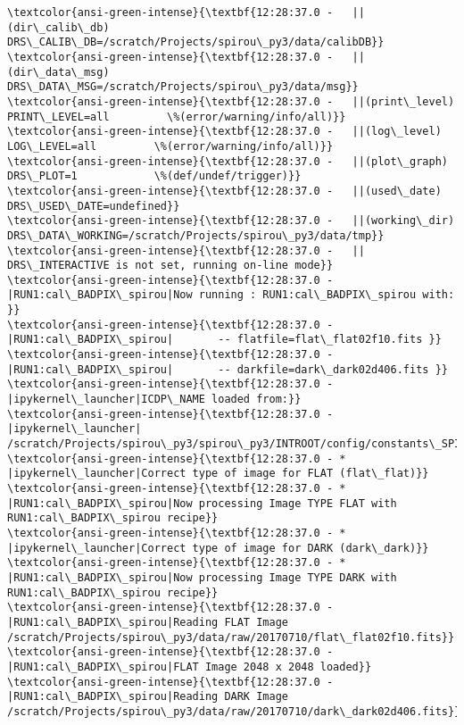 \documentclass[11pt]{article}
\begin{document}
\begin{Verbatim}[commandchars=\\\{\}]
\textcolor{ansi-green-intense}{\textbf{12:28:37.0 -   ||(dir\_calib\_db)      DRS\_CALIB\_DB=/scratch/Projects/spirou\_py3/data/calibDB}}
\textcolor{ansi-green-intense}{\textbf{12:28:37.0 -   ||(dir\_data\_msg)      DRS\_DATA\_MSG=/scratch/Projects/spirou\_py3/data/msg}}
\textcolor{ansi-green-intense}{\textbf{12:28:37.0 -   ||(print\_level)       PRINT\_LEVEL=all         \%(error/warning/info/all)}}
\textcolor{ansi-green-intense}{\textbf{12:28:37.0 -   ||(log\_level)         LOG\_LEVEL=all         \%(error/warning/info/all)}}
\textcolor{ansi-green-intense}{\textbf{12:28:37.0 -   ||(plot\_graph)        DRS\_PLOT=1            \%(def/undef/trigger)}}
\textcolor{ansi-green-intense}{\textbf{12:28:37.0 -   ||(used\_date)         DRS\_USED\_DATE=undefined}}
\textcolor{ansi-green-intense}{\textbf{12:28:37.0 -   ||(working\_dir)       DRS\_DATA\_WORKING=/scratch/Projects/spirou\_py3/data/tmp}}
\textcolor{ansi-green-intense}{\textbf{12:28:37.0 -   ||                    DRS\_INTERACTIVE is not set, running on-line mode}}
\textcolor{ansi-green-intense}{\textbf{12:28:37.0 -   |RUN1:cal\_BADPIX\_spirou|Now running : RUN1:cal\_BADPIX\_spirou with: }}
\textcolor{ansi-green-intense}{\textbf{12:28:37.0 -   |RUN1:cal\_BADPIX\_spirou|       -- flatfile=flat\_flat02f10.fits }}
\textcolor{ansi-green-intense}{\textbf{12:28:37.0 -   |RUN1:cal\_BADPIX\_spirou|       -- darkfile=dark\_dark02d406.fits }}
\textcolor{ansi-green-intense}{\textbf{12:28:37.0 -   |ipykernel\_launcher|ICDP\_NAME loaded from:}}
\textcolor{ansi-green-intense}{\textbf{12:28:37.0 -   |ipykernel\_launcher|     /scratch/Projects/spirou\_py3/spirou\_py3/INTROOT/config/constants\_SPIROU\_H2RG.py}}
\textcolor{ansi-green-intense}{\textbf{12:28:37.0 - * |ipykernel\_launcher|Correct type of image for FLAT (flat\_flat)}}
\textcolor{ansi-green-intense}{\textbf{12:28:37.0 - * |RUN1:cal\_BADPIX\_spirou|Now processing Image TYPE FLAT with RUN1:cal\_BADPIX\_spirou recipe}}
\textcolor{ansi-green-intense}{\textbf{12:28:37.0 - * |ipykernel\_launcher|Correct type of image for DARK (dark\_dark)}}
\textcolor{ansi-green-intense}{\textbf{12:28:37.0 - * |RUN1:cal\_BADPIX\_spirou|Now processing Image TYPE DARK with RUN1:cal\_BADPIX\_spirou recipe}}
\textcolor{ansi-green-intense}{\textbf{12:28:37.0 -   |RUN1:cal\_BADPIX\_spirou|Reading FLAT Image /scratch/Projects/spirou\_py3/data/raw/20170710/flat\_flat02f10.fits}}
\textcolor{ansi-green-intense}{\textbf{12:28:37.0 -   |RUN1:cal\_BADPIX\_spirou|FLAT Image 2048 x 2048 loaded}}
\textcolor{ansi-green-intense}{\textbf{12:28:37.0 -   |RUN1:cal\_BADPIX\_spirou|Reading DARK Image /scratch/Projects/spirou\_py3/data/raw/20170710/dark\_dark02d406.fits}}

\end{Verbatim}
\end{document}
